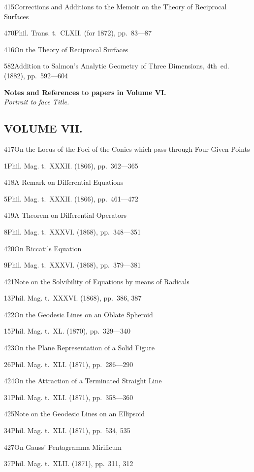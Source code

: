 \documentclass[11pt,a4paper]{book}
\providecommand{\tocentry}[2]{#1\dotfill #2\par}
\begin{document}
\tocentry{415}{Corrections and Additions to the Memoir on the Theory of Reciprocal Surfaces}{470}{Phil. Trans. t.~CLXII. (for 1872), pp.~83---87}

\tocentry{416}{On the Theory of Reciprocal Surfaces}{582}{Addition to Salmon's Analytic Geometry of Three Dimensions, 4th~ed. (1882), pp.~592---604}

\vspace{1cm}
\noindent\textbf{Notes and References to papers in Volume VI.} \\
\noindent\textit{Portrait to face Title.}

\newpage

\subsection*{VOLUME VII.}

\tocentry{417}{On the Locus of the Foci of the Conics which pass through Four Given Points}{1}{Phil. Mag. t.~XXXII. (1866), pp.~362---365}

\tocentry{418}{A Remark on Differential Equations}{5}{Phil. Mag. t.~XXXII. (1866), pp.~461---472}

\tocentry{419}{A Theorem on Differential Operators}{8}{Phil. Mag. t.~XXXVI. (1868), pp.~348---351}

\tocentry{420}{On Riccati's Equation}{9}{Phil. Mag. t.~XXXVI. (1868), pp.~379---381}

\tocentry{421}{Note on the Solvibility of Equations by means of Radicals}{13}{Phil. Mag. t.~XXXVI. (1868), pp.~386, 387}

\tocentry{422}{On the Geodesic Lines on an Oblate Spheroid}{15}{Phil. Mag. t.~XL. (1870), pp.~329---340}

\tocentry{423}{On the Plane Representation of a Solid Figure}{26}{Phil. Mag. t.~XLI. (1871), pp.~286---290}

\tocentry{424}{On the Attraction of a Terminated Straight Line}{31}{Phil. Mag. t.~XLI. (1871), pp.~358---360}

\tocentry{425}{Note on the Geodesic Lines on an Ellipsoid}{34}{Phil. Mag. t.~XLI. (1871), pp.~534, 535}


\tocentry{427}{On Gauss' Pentagramma Mirificum}{37}{Phil. Mag. t.~XLII. (1871), pp.~311, 312}
\end{document}
